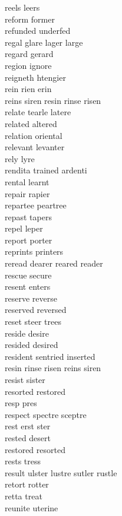 reels leers\\
reform former\\
refunded underfed\\
regal glare lager large\\
regard gerard\\
region ignore\\
reigneth htengier\\
rein rien erin\\
reins siren resin rinse risen\\
relate tearle latere\\
related altered\\
relation oriental\\
relevant levanter\\
rely lyre\\
rendita trained ardenti\\
rental learnt\\
repair rapier\\
repartee peartree\\
repast tapers\\
repel leper\\
report porter\\
reprints printers\\
reread dearer reared reader\\
rescue secure\\
resent enters\\
reserve reverse\\
reserved reversed\\
reset steer trees\\
reside desire\\
resided desired\\
resident sentried inserted\\
resin rinse risen reins siren\\
resist sister\\
resorted restored\\
resp pres\\
respect spectre sceptre\\
rest erst ster\\
rested desert\\
restored resorted\\
rests tress\\
result ulster lustre sutler rustle\\
retort rotter\\
retta treat\\
reunite uterine\\
